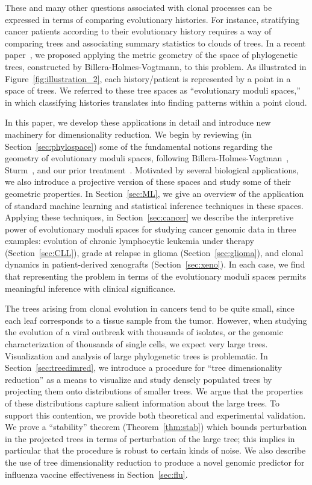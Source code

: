 \documentclass[a4paper,11pt]{article}
\begin{document}
These and many other questions associated with clonal processes can be expressed in terms of comparing evolutionary histories.
For instance, stratifying cancer patients according to their evolutionary history requires a way of comparing trees and associating summary statistics to clouds of trees.
In a recent paper~\cite{zairis2014moduli}, we proposed applying the metric geometry of the space of phylogenetic trees, constructed by Billera-Holmes-Vogtmann, to this problem.
As illustrated in Figure~\ref{fig:illustration_2}, each history/patient is represented by a point in a space of trees.
We referred to these tree spaces as ``evolutionary moduli spaces,'' in which classifying histories translates into finding patterns within a point cloud.

In this paper, we develop these applications in detail and introduce new machinery for dimensionality reduction.
We begin by reviewing (in Section~\ref{sec:phylospace}) some of the fundamental notions regarding the geometry of evolutionary moduli spaces, following Billera-Holmes-Vogtman~\cite{billera2001geometry}, Sturm~\cite{sturm2003probability}, and our prior treatment~\cite{zairis2014moduli}.
Motivated by several biological applications, we also introduce a projective version of these spaces and study some of their geometric properties.
In Section~\ref{sec:ML}, we give an overview of the application of standard machine learning and statistical inference techniques in these spaces.
Applying these techniques, in Section~\ref{sec:cancer} we describe the interpretive power of evolutionary moduli spaces for studying cancer genomic data in three examples: evolution of chronic lymphocytic leukemia under therapy (Section~\ref{sec:CLL}), grade at relapse in glioma (Section~\ref{sec:glioma}), and clonal dynamics in patient-derived xenografts (Section~\ref{sec:xeno}).
In each case, we find that representing the problem in terms of the evolutionary moduli spaces permits meaningful inference with clinical significance.

The trees arising from clonal evolution in cancers tend to be quite small, since each leaf corresponds to a tissue sample from the tumor.
However, when studying the evolution of a viral outbreak with thousands of isolates, or the genomic characterization of thousands of single cells, we expect very large trees.
Visualization and analysis of large phylogenetic trees is problematic.
In Section~\ref{sec:treedimred}, we introduce a procedure for ``tree dimensionality reduction'' as a means to visualize and study densely populated trees by projecting them onto distributions of smaller trees.
We argue that the properties of these distributions capture salient information about the large trees.
To support this contention, we provide both theoretical and experimental validation.
We prove a ``stability'' theorem (Theorem~\ref{thm:stab}) which bounds perturbation in the projected trees in terms of perturbation of the large tree; this implies in particular that the procedure is robust to certain kinds of noise.
We also describe the use of tree dimensionality reduction to produce a novel genomic predictor for influenza vaccine effectiveness in Section~\ref{sec:flu}.
\end{document}
